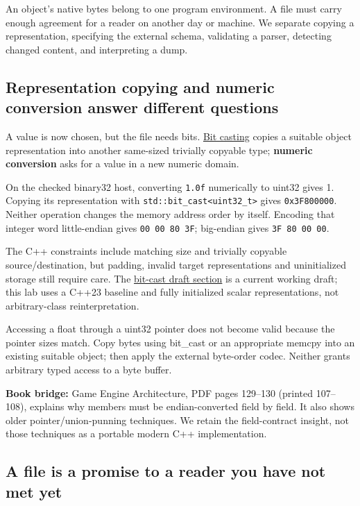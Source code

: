 An object's native bytes belong to one program environment. A file must carry enough agreement for a reader on another day or machine. We separate copying a representation, specifying the external schema, validating a parser, detecting changed content, and interpreting a dump.

\subsection{Representation copying and numeric conversion answer different questions}\label{05-engine-i-ch002-representation-copying-and-numeric-conversion-answer-different-questions}

A value is now chosen, but the file needs bits. \hyperref[appendix-34ee45f161c1]{Bit casting} copies a suitable object representation into another same-sized trivially copyable type; \textbf{numeric conversion} asks for a value in a new numeric domain.

On the checked binary32 host, converting \texttt{1.0f} numerically to uint32 gives 1. Copying its representation with \texttt{std::bit\_cast\textless{}uint32\_t\textgreater{}} gives \texttt{0x3F800000}. Neither operation changes the memory address order by itself. Encoding that integer word little-endian gives \texttt{00\ 00\ 80\ 3F}; big-endian gives \texttt{3F\ 80\ 00\ 00}.

The C++ constraints include matching size and trivially copyable source/destination, but padding, invalid target representations and uninitialized storage still require care. The \href{https://eel.is/c++draft/bit.cast}{bit-cast draft section} is a current working draft; this lab uses a C++23 baseline and fully initialized scalar representations, not arbitrary-class reinterpretation.

Accessing a float through a uint32 pointer does not become valid because the pointer sizes match. Copy bytes using bit\_cast or an appropriate memcpy into an existing suitable object; then apply the external byte-order codec. Neither grants arbitrary typed access to a byte buffer.

\textbf{Book bridge:} Game Engine Architecture, PDF pages 129--130 (printed 107--108), explains why members must be endian-converted field by field. It also shows older pointer/union-punning techniques. We retain the field-contract insight, not those techniques as a portable modern C++ implementation.

\subsection{A file is a promise to a reader you have not met yet}\label{05-engine-i-ch002-a-file-is-a-promise-to-a-reader-you-have-not-met-yet}

